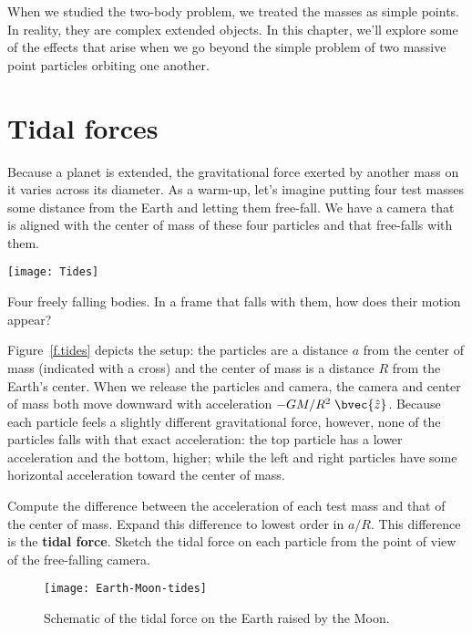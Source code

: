 
When we studied the two-body problem, we treated the masses as simple points. In reality, they are complex extended objects.  In this chapter, we'll explore some of the effects that arise when we go beyond the simple problem of two massive point particles orbiting one another. 

\section{Tidal forces}
Because a planet is extended, the gravitational force exerted by another mass on it varies across its diameter. As a warm-up, let's imagine putting four test masses some distance from the Earth and letting them free-fall.  We have a camera that is aligned with the center of mass of these four particles and that free-falls with them.
\begin{marginfigure}
\texttt{[image: Tides]}
\caption[Four freely falling bodies]{Four freely falling bodies.  In a frame that falls with them, how does their motion appear?
\label{f.tides}}
\end{marginfigure}

Figure~\ref{f.tides} depicts the setup: the particles are a distance $a$ from the center of mass (indicated with a cross) and the center of mass is a distance $R$ from the Earth's center.
When we release the particles and camera, the camera and center of mass both move downward with acceleration $-GM/R^{2}\;\bvec{\hat{z}}$.  Because each particle feels a slightly different gravitational force, however, none of the particles falls with that exact acceleration: the top particle has a lower acceleration and the bottom, higher; while the left and right particles have some horizontal acceleration 
toward the center of mass.

\begin{exercisebox}
\label{ex:simple-tidal}
Compute the difference between the acceleration of each test mass and that of the center of mass.  Expand this difference to lowest order in $a/R$.  This difference is the \textbf{tidal force}.  Sketch the tidal force on each particle from the point of view of the free-falling camera.
\end{exercisebox}

\begin{figure*}[hbtp]
\texttt{[image: Earth-Moon-tides]}
\caption[Tidal force on the Earth]{Schematic of the tidal force on the Earth raised by the Moon.
\label{f.Earth-Moon-tides}}
\end{figure*}

